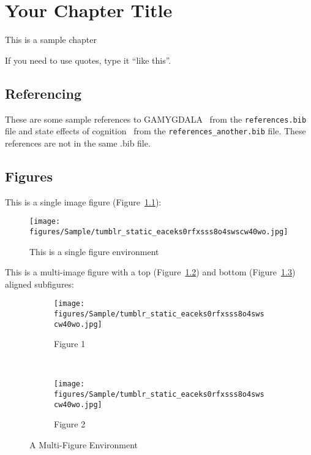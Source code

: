 \chapter{Your Chapter Title}

This is a sample chapter

If you need to use quotes, type it ``like this''.

\section{Referencing}
These are some sample references to GAMYGDALA~\citep{popescu2014gamygdala} from 
the \texttt{references.bib} file and state effects of 
cognition~\citep{hudlicka2002time} from the \texttt{references\_another.bib} 
file. These references are not in the same .bib file.

\section{Figures}
This is a single image figure (Figure~\ref{fig_singleenv}):

\begin{figure}[ht]
    \centering
    \texttt{[image: figures/Sample/tumblr\_static\_eaceks0rfxsss8o4swscw40wo.jpg]}
    \caption[Single Figure Environment Listed Title]{This is a single figure 
    environment}
    \label{fig_singleenv}
\end{figure}

This is a multi-image figure with a top (Figure~\ref{fig_multienv_1}) and bottom (Figure~\ref{fig_multienv_2}) aligned subfigures:

\begin{figure}[ht]
	\centering
	\begin{subfigure}[t]{\textwidth}
		\centering
		
\texttt{[image: figures/Sample/tumblr\_static\_eaceks0rfxsss8o4swscw40wo.jpg]}
		\caption{Figure 1}
		\label{fig_multienv_1}
	\end{subfigure}
	~
	\begin{subfigure}[t]{\textwidth}
		\centering
		
\texttt{[image: figures/Sample/tumblr\_static\_eaceks0rfxsss8o4swscw40wo.jpg]}
		\caption{Figure 2}
		\label{fig_multienv_2}
	\end{subfigure}
	
	\caption{A Multi-Figure Environment}
	\label{fig_multienv}
\end{figure}

